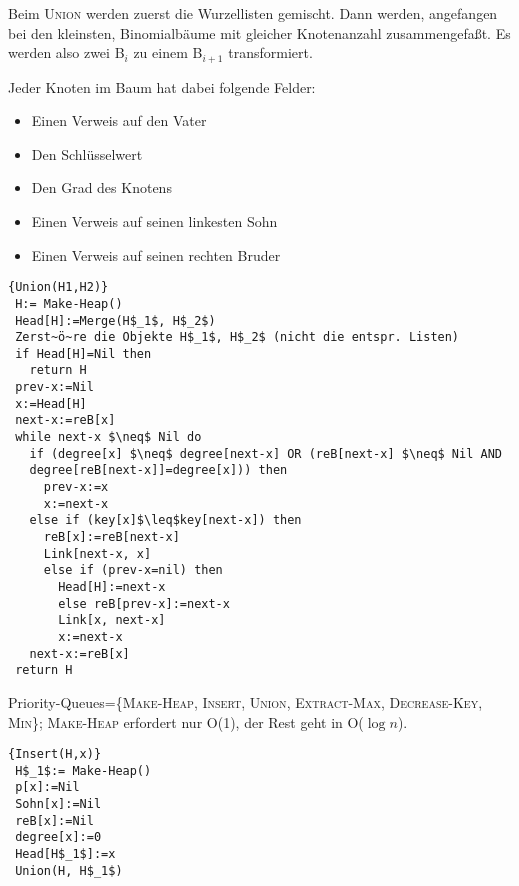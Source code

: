 Beim \textsc{Union} werden zuerst die Wurzellisten gemischt. Dann werden, angefangen bei den kleinsten,
Binomialbäume mit gleicher Knotenanzahl zusammengefaßt. Es werden also zwei B$_i$ zu einem B$_{i+1}$
transformiert.

Jeder Knoten im Baum hat dabei folgende Felder:
\begin{itemize}
\item Einen Verweis auf den Vater
\item Den Schlüsselwert
\item Den Grad des Knotens
\item Einen Verweis auf seinen linkesten Sohn
\item Einen Verweis auf seinen rechten Bruder
\end{itemize}

\begin{Algorithmus}[H]
\begin{lstlisting}[frame=tlrb, mathescape=true, title=\textsc{Union\textnormal{(H$_1$, H$_2$)}}, gobble=1]{Union(H1,H2)}
 H:= Make-Heap()
 Head[H]:=Merge(H$_1$, H$_2$)
 Zerst~ö~re die Objekte H$_1$, H$_2$ (nicht die entspr. Listen)
 if Head[H]=Nil then
   return H
 prev-x:=Nil
 x:=Head[H]
 next-x:=reB[x]
 while next-x $\neq$ Nil do
   if (degree[x] $\neq$ degree[next-x] OR (reB[next-x] $\neq$ Nil AND 
   degree[reB[next-x]]=degree[x])) then
     prev-x:=x
     x:=next-x
   else if (key[x]$\leq$key[next-x]) then
     reB[x]:=reB[next-x]
     Link[next-x, x]
     else if (prev-x=nil) then
       Head[H]:=next-x
       else reB[prev-x]:=next-x
       Link[x, next-x]
       x:=next-x
   next-x:=reB[x]
 return H    
\end{lstlisting}
\end{Algorithmus}

Priority-Queues=\{\textsc{Make-Heap}, \textsc{Insert}, \textsc{Union}, \textsc{Extract-Max}, \textsc{Decrease-Key},
\textsc{Min}\};
\textsc{Make-Heap} erfordert nur O(1), der Rest geht in O($\log n$).
 

\begin{Algorithmus}[H]
\begin{lstlisting}[frame=tlrb, mathescape=true, title=\textsc{Insert\textnormal{(H, x)}}, gobble=1]{Insert(H,x)}
 H$_1$:= Make-Heap()
 p[x]:=Nil
 Sohn[x]:=Nil
 reB[x]:=Nil
 degree[x]:=0
 Head[H$_1$]:=x
 Union(H, H$_1$) 
\end{lstlisting}
\end{Algorithmus}

